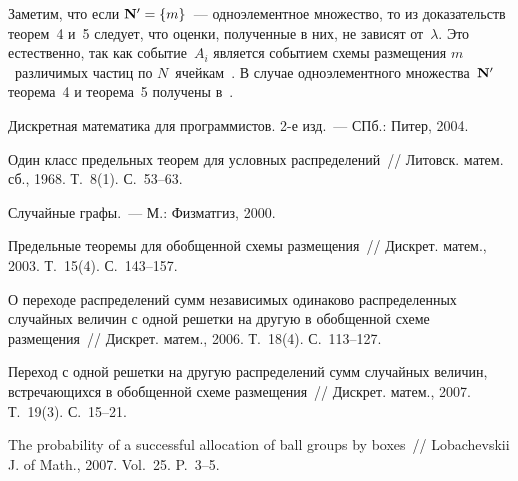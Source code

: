 \begin{multicols}{2}

Заметим, что если ${\bf N'}=\{m\}$~--- одноэлементное множество, то
из доказательств  теорем~4 и~5 следует, что оценки, полученные в
них, не зависят от~$\lambda$. Это  естественно, так как событие~$A_i$
является событием схемы размещения $m$~различимых частиц по
$N$~ячейкам~\cite{3ch}. В случае одноэлементного множества~${\bf N'}$
теорема~4 и теорема~5 получены в~\cite{7ch}.

{\small\frenchspacing
{%
\begin{thebibliography}{9}

Дискретная математика для программистов. 2-е изд.~--- СПб.: Питер, 2004.

Один класс предельных теорем для условных распределений~// Литовск. матем. сб., 1968. Т.~8(1). С.~53--63.

Случайные графы.~--- М.: Физматгиз, 2000.

Предельные теоремы для обобщенной схемы размещения~// Дискрет. матем., 2003. Т.~15(4). С.~143--157.

О переходе распределений сумм независимых одинаково распределенных случайных величин с одной
решетки на другую в обобщенной схеме размещения~// Дискрет. матем., 2006. Т.~18(4). С.~113--127.

Переход с одной решетки на другую распределений сумм случайных величин, встречающихся в
обобщенной схеме размещения~// Дискрет. матем., 2007. Т.~19(3). С.~15--21.

\label{end\stat}

The probability of a successful allocation of ball groups by boxes~// Lobachevskii J.
of Math., 2007. Vol.~25. P.~3--5.
 \end{thebibliography}
}
}
\end{multicols}